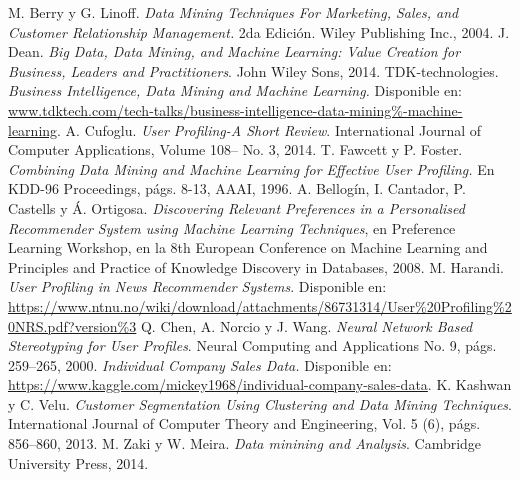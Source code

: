 \documentclass[letterpaper,11pt]{article}
\begin{document}
\begin{multicols}{2}
\begin{thebibliography}{10}
     M. Berry y G. Linoff. {\em Data Mining Techniques For Marketing, Sales, and Customer Relationship Management.} 
        2da Edición. Wiley Publishing Inc., 2004. 
     J. Dean. {\em Big Data, Data Mining, and Machine Learning: Value Creation for Business, Leaders and
        Practitioners}. John Wiley  Sons, 2014.
     TDK-technologies. {\em Business Intelligence, Data Mining and Machine Learning.} 
        Disponible en: \url{www.tdktech.com/tech-talks/business-intelligence-data-mining%-machine-learning}. 
         A. Cufoglu. {\em User Profiling-A Short Review}. International Journal of Computer Applications,
        Volume 108-- No. 3, 2014.
     T. Fawcett y P. Foster. {\em Combining Data Mining and Machine Learning for Effective User
        Profiling.} En KDD-96 Proceedings, págs. 8-13, AAAI, 1996.
     A. Bellogín, I. Cantador, P. Castells y Á. Ortigosa. {\em Discovering Relevant Preferences in a Personalised
        Recommender System using Machine Learning Techniques}, en Preference Learning Workshop, en la 8th
        European Conference on Machine  Learning and Principles and Practice of Knowledge Discovery in Databases, 2008. 
     M. Harandi. {\em User Profiling in News Recommender Systems}. Disponible en:
        \url{https://www.ntnu.no/wiki/download/attachments/86731314/User%20Profiling%20NRS.pdf?version%3}
     Q. Chen, A. Norcio y J. Wang. {\em Neural Network Based Stereotyping for User Profiles}. Neural
        Computing and Applications No. 9, págs. 259--265,  2000.
     {\em Individual Company Sales Data.} Disponible en:
        \url{https://www.kaggle.com/mickey1968/individual-company-sales-data}. 
     K. Kashwan y C. Velu. {\em Customer Segmentation Using Clustering and Data Mining Techniques}. International Journal of Computer Theory 
        and Engineering, Vol. 5 (6), págs. 856--860, 2013. 
     M. Zaki y W. Meira. {\em Data minining and Analysis}. Cambridge University Press, 2014. 

\end{thebibliography}
\end{multicols}
\end{document}
